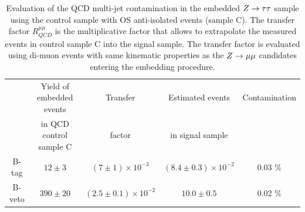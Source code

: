 \begin{table} [tp]
\begin{small}
\centering
\begin{tabular}{c c c c c}
\hline
\hline
 & Yield of embedded events	& Transfer	& Estimated events	& Contamination \\
 &  in QCD control sample C		& factor	& in signal sample	&	\\		 [0.5ex]
\hline
B-tag  & $12 \pm 3$ & $ (7 \pm 1) \times 10^{-3}$ &  $(8.4 \pm 0.3) \times 10^{-2}$ &  0.03 \% \\
B-veto & $390 \pm 20$ & $(2.5 \pm 0.1) \times 10^{-2}$ & $10.0 \pm 0.5$ & 0.02 \% \\[1ex]
\hline
\end{tabular}
\end{small}
\caption{Evaluation of the QCD multi-jet contamination  in the embedded $Z\rightarrow \tau\tau$ sample  using the control sample
 with OS anti-isolated events (sample C). The transfer factor $R_{QCD}^{\mu\mu}$ is the
multiplicative factor that allows to extrapolate the measured events in control sample C into the signal sample.
The transfer factor is evaluated using di-muon events with same kinematic properties as the  $Z\rightarrow \mu\mu$ candidates 
entering the embedding procedure.}
\label{table:emb_cont_qcd}
\end{table}



